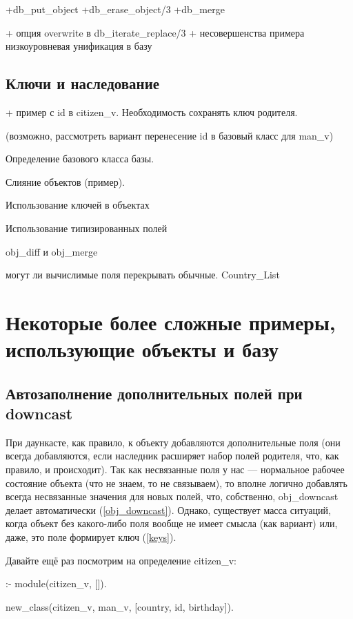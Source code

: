 \documentclass[a4paper]{book}
\begin{document}
+db_put_object
+db_erase_object/3
+db_merge

+ опция overwrite в db_iterate_replace/3 + несовершенства примера
низкоуровневая унификация в базу


\subsection{Ключи и наследование}
\label{keys_inheritance}

+ пример с id в citizen_v. Необходимость сохранять ключ родителя.

(возможно, рассмотреть вариант перенесение id в базовый класс для
man_v)

Определение базового класса базы.

Слияние объектов (пример).


Использование ключей в объектах

Использование типизированных полей

obj\_diff и obj\_merge

могут ли вычислимые поля перекрывать обычные. Country\_List

\section{Некоторые более сложные примеры, использующие объекты и
  базу}

\subsection{Автозаполнение дополнительных полей при downcast}

При даункасте, как правило, к объекту добавляются дополнительные
поля (они всегда добавляются, если наследник расширяет набор
полей родителя, что, как правило, и происходит). Так как
несвязанные поля у нас --- нормальное рабочее состояние объекта
(что не знаем, то не связываем), то вполне логично добавлять
всегда несвязанные значения для новых полей, что, собственно,
obj_downcast делает автоматически (\ref{obj_downcast}). Однако,
существует масса ситуаций, когда объект без какого-либо поля
вообще не имеет смысла (как вариант) или, даже, это поле
формирует ключ (\ref{keys}).

Давайте ещё раз посмотрим на определение citizen_v:

\begin{example}{}{}
:- module(citizen_v, []).

new_class(citizen_v, man_v, [country, id, birthday]).
\end{example}
\end{document}
